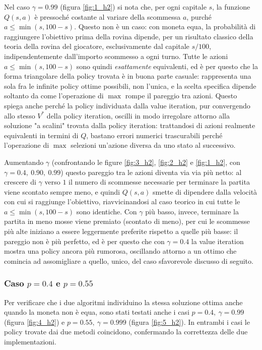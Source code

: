 Nel caso $\gamma = 0.99$ (figura \ref{fig:1_h2}) si nota che, per ogni capitale $s$, la funzione $Q(s,a)$ è pressoché costante al variare della scommessa $a$, purché $a \le \min(s, 100-s)$. Questo non è un caso: con moneta equa, la probabilità di raggiungere l'obiettivo prima della rovina dipende, per un risultato classico della teoria della rovina del giocatore, esclusivamente dal capitale $s/100$, indipendentemente dall'importo scommesso a ogni turno. Tutte le azioni $a \le \min(s,100-s)$ sono quindi \emph{esattamente} equivalenti, ed è per questo che la forma triangolare della policy trovata è in buona parte casuale: rappresenta una sola fra le infinite policy ottime possibili, non l'unica, e la scelta specifica dipende soltanto da come l'operazione di $\max$ rompe il pareggio tra azioni. Questo spiega anche perché la policy individuata dalla value iteration, pur convergendo allo stesso $V^*$ della policy iteration, oscilli in modo irregolare attorno alla soluzione "a scalini" trovata dalla policy iteration: trattandosi di azioni realmente equivalenti in termini di $Q$, bastano errori numerici trascurabili perché l'operazione di $\max$ selezioni un'azione diversa da uno stato al successivo.

Aumentando $\gamma$ (confrontando le figure \ref{fig:3_h2}, \ref{fig:2_h2} e \ref{fig:1_h2}, con $\gamma = 0.4,\ 0.90,\ 0.99$) questo pareggio tra le azioni diventa via via più netto: al crescere di $\gamma$ verso $1$ il numero di scommesse necessarie per terminare la partita viene scontato sempre meno, e quindi $Q(s,a)$ smette di dipendere dalla velocità con cui si raggiunge l'obiettivo, riavvicinandosi al caso teorico in cui tutte le $a\le\min(s,100-s)$ sono identiche. Con $\gamma$ più basso, invece, terminare la partita in meno mosse viene premiato (scontato di meno), per cui le scommesse più alte iniziano a essere leggermente preferite rispetto a quelle più basse: il pareggio non è più perfetto, ed è per questo che con $\gamma=0.4$ la value iteration mostra una policy ancora più rumorosa, oscillando attorno a un ottimo che comincia ad assomigliare a quello, unico, del caso sfavorevole discusso di seguito.


\subsubsection*{Caso $p = 0.4$ e $p = 0.55$}
Per verificare che i due algoritmi individuino la stessa soluzione ottima anche quando la moneta non è equa, sono stati testati anche i casi $p = 0.4,\ \gamma = 0.99$ (figura \ref{fig:4_h2}) e $p = 0.55,\ \gamma = 0.999$ (figura \ref{fig:5_h2}). In entrambi i casi le policy trovate dai due metodi coincidono, confermando la correttezza delle due implementazioni.

